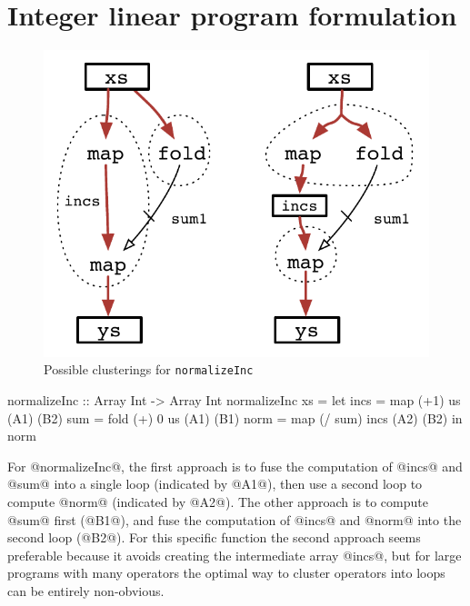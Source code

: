 \section{Integer linear program formulation}
\label{s:ILP}

\begin{figure}[ht!]
\begin{center}
\includegraphics[scale=0.5]{figures/ex2-normalizeInc.pdf}
\end{center}
\caption{Possible clusterings for \texttt{normalizeInc}}
\end{figure}

 
\begin{code}
 normalizeInc :: Array Int -> Array Int
 normalizeInc xs
  = let incs = map  (+1)    us      (A1) (B2)
        sum  = fold (+) 0   us      (A1) (B1)
        norm = map  (/ sum) incs    (A2) (B2)
    in  norm
\end{code}

For @normalizeInc@, the first approach is to fuse the computation of @incs@ and @sum@ into a single loop (indicated by @A1@), then use a second loop to compute @norm@ (indicated by @A2@). The other approach is to compute @sum@ first (@B1@), and fuse the computation of @incs@ and @norm@ into the second loop (@B2@). For this specific function the second approach seems preferable because it avoids creating the intermediate array @incs@, but for large programs with many operators the optimal way to cluster operators into loops can be entirely non-obvious. 

